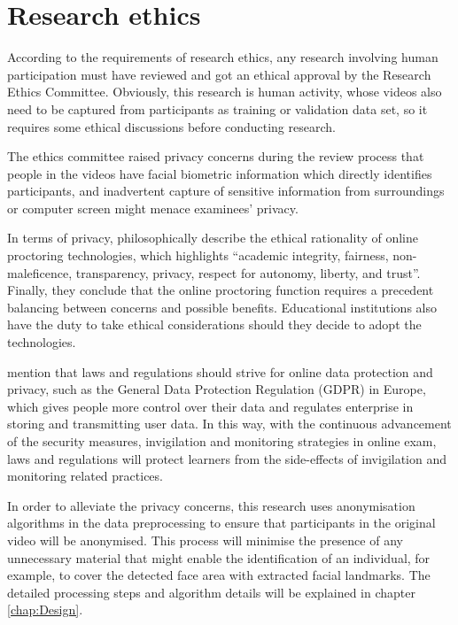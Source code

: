 \section{Research ethics}
\label{sec:Research ethics}
According to the requirements of research ethics, any research involving human participation must have reviewed and got an ethical approval by the Research Ethics Committee.
Obviously, this research is human activity, whose videos also need to be captured from participants as training or validation data set, so it requires some ethical discussions before conducting research.

The ethics committee raised privacy concerns during the review process that people in the videos have facial biometric information which directly identifies participants, and inadvertent capture of sensitive information from surroundings or computer screen might menace examinees' privacy.

In terms of privacy, \citet{coghlan2020good} philosophically describe the ethical rationality of online proctoring technologies, which highlights ``academic integrity, fairness, non-maleficence, transparency, privacy, respect for autonomy, liberty, and trust''.
Finally, they conclude that the online proctoring function requires a precedent balancing between concerns and possible benefits.
Educational institutions also have the duty to take ethical considerations should they decide to adopt the technologies.

\citet{bozkurt2020education} mention that laws and regulations should strive for online data protection and privacy, such as the General Data Protection Regulation (GDPR) in Europe, which gives people more control over their data and regulates enterprise in storing and transmitting user data.
In this way, with the continuous advancement of the security measures, invigilation and monitoring strategies in online exam, laws and regulations will protect learners from the side-effects of invigilation and monitoring related practices.

In order to alleviate the privacy concerns, this research uses anonymisation algorithms in the data preprocessing to ensure that participants in the original video will be anonymised.
This process will minimise the presence of any unnecessary material that might enable the identification of an individual, for example, to cover the detected face area with extracted facial landmarks.
The detailed processing steps and algorithm details will be explained in chapter \ref{chap:Design}.